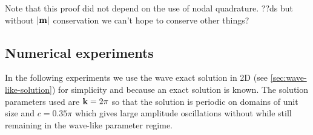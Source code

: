 
Note that this proof did not depend on the use of nodal quadrature.
??ds but without $|\mathbf{m}|$ conservation we can't hope to conserve other things?


\subsection{Numerical experiments}
\label{sec:numer-exper}

In the following experiments we use the wave exact solution in 2D (see \autoref{sec:wave-like-solution}) for simplicity and because an exact solution is known.
The solution parameters used are $\mathbf{k} = 2\pi$ so that the solution is periodic on domains of unit size and $c = 0.35\pi$ which gives large amplitude oscillations without while still remaining in the wave-like parameter regime.

